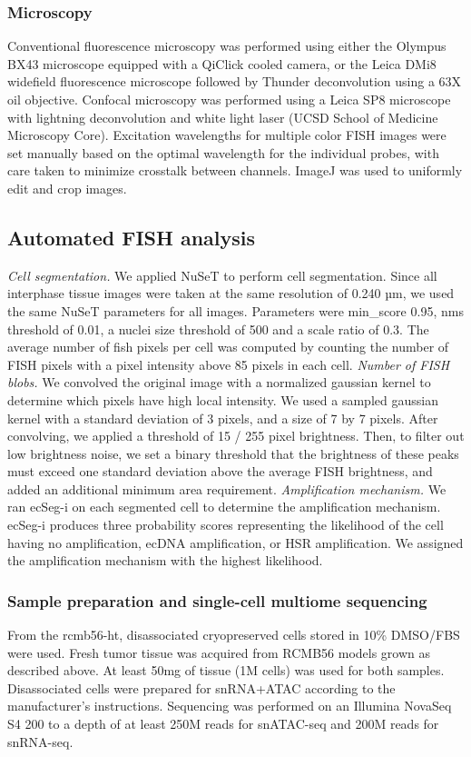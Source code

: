 \subsubsection{Microscopy}
Conventional fluorescence microscopy was performed using either the Olympus BX43 microscope equipped with a QiClick cooled camera, or the Leica DMi8 widefield fluorescence microscope followed by Thunder deconvolution using a 63X oil objective. Confocal microscopy was performed using a Leica SP8 microscope with lightning deconvolution and white light laser (UCSD School of Medicine Microscopy Core). Excitation wavelengths for multiple color FISH images were set manually based on the optimal wavelength for the individual probes, with care taken to minimize crosstalk between channels. ImageJ was used to uniformly edit and crop images. 

\subsection{Automated FISH analysis}
\textit{Cell segmentation.} We applied NuSeT \cite{nuset} to perform cell segmentation. Since all interphase tissue images were taken at the same resolution of 0.240 µm, we used the same NuSeT parameters for all images. Parameters were min\_score 0.95, nms threshold of 0.01, a nuclei size threshold of 500 and a scale ratio of 0.3. The average number of fish pixels per cell was computed by counting the number of FISH pixels with a pixel intensity above 85 pixels in each cell. 
\textit{Number of FISH blobs.} We convolved the original image with a normalized gaussian kernel to determine which pixels have high local intensity. We used a sampled gaussian kernel with a standard deviation of 3 pixels, and a size of 7 by 7 pixels. After convolving, we applied a threshold of 15 / 255 pixel brightness. Then, to filter out low brightness noise, we set a binary threshold that the brightness of these peaks must exceed one standard deviation above the average FISH brightness, and added an additional minimum area requirement.
\textit{Amplification mechanism.} We ran ecSeg-i \cite{ecseg} on each segmented cell to determine the amplification mechanism. ecSeg-i produces three probability scores representing the likelihood of the cell having no amplification, \gls{ecDNA} amplification, or \gls{HSR} amplification. We assigned the amplification mechanism with the highest likelihood. 

\subsubsection{Sample preparation and single-cell multiome sequencing}
From the \acrfull{rcmb56-ht}, disassociated cryopreserved cells stored in 10\% DMSO/FBS were used. Fresh tumor tissue was acquired from RCMB56 models grown as described above. At least 50mg of tissue (1M cells) was used for both samples. Disassociated cells were prepared for \acrfull{snRNA+ATAC} according to the manufacturer's instructions\cite{scRNA+ATAC_protocol}. Sequencing was performed on an Illumina NovaSeq S4 200 to a depth of at least 250M reads for snATAC-seq and 200M reads for snRNA-seq.
